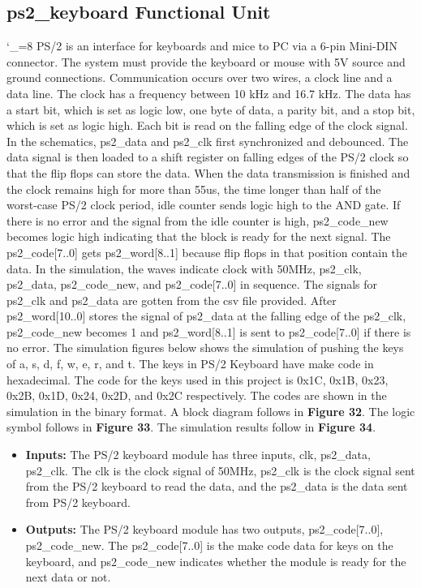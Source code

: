 \documentclass[a4paper]{article}
\begin{document}
\subsection{ps2\_keyboard Functional Unit}
\catcode`_=8
PS/2 is an interface for keyboards and mice to PC via a 6-pin Mini-DIN connector. The system must provide the keyboard or mouse with 5V source and ground connections. Communication occurs over two wires, a clock line and a data line. The clock has a frequency between 10 kHz and 16.7 kHz. The data has a start bit, which is set as logic low, one byte of data, a parity bit, and a stop bit, which is set as logic high. Each bit is read on the falling edge of the clock signal. In the schematics, ps2\_data and ps2\_clk first synchronized and debounced. The data signal is then loaded to a shift register on falling edges of the PS/2 clock so that the flip flops can store the data. When the data transmission is finished and the clock remains high for more than 55us, the time longer than half of the worst-case PS/2 clock period, idle counter sends logic high to the AND gate. If there is no error and the signal from the idle counter is high, ps2\_code\_new becomes logic high indicating that the block is ready for the next signal. The ps2\_code[7..0] gets ps2\_word[8..1] because flip flops in that position contain the data. In the simulation, the waves indicate clock with 50MHz, ps2\_clk, ps2\_data, ps2\_code\_new, and ps2\_code[7..0] in sequence. The signals for ps2\_clk and ps2\_data are gotten from the csv file provided. After ps2\_word[10..0] stores the signal of ps2\_data at the falling edge of the ps2\_clk, ps2\_code\_new becomes 1 and ps2\_word[8..1] is sent to ps2\_code[7..0] if there is no error. The simulation figures below shows the simulation of pushing the keys of a, s, d, f, w, e, r, and t. The keys in PS/2 Keyboard have make code in hexadecimal. The code for the keys used in this project is 0x1C, 0x1B, 0x23, 0x2B, 0x1D, 0x24, 0x2D, and 0x2C respectively. The codes are shown in the simulation in the binary format.  A block diagram follows in \textbf{Figure 32}.  The logic symbol follows in \textbf{Figure 33}.  The simulation results follow in \textbf{Figure 34}.
\begin{itemize}
\item \textbf{Inputs:  } The PS/2 keyboard module has three inputs, clk, ps2\_data, ps2\_clk. The clk is the clock signal of 50MHz, ps2\_clk is the clock signal sent from the PS/2 keyboard to read the data, and the ps2\_data is the data sent from PS/2 keyboard.
\item \textbf{Outputs: } The PS/2 keyboard module has two outputs, ps2\_code[7..0], ps2\_code\_new. The ps2\_code[7..0] is the make code data for keys on the keyboard, and ps2\_code\_new indicates whether the module is ready for the next data or not.
\end{itemize}
\end{document}
